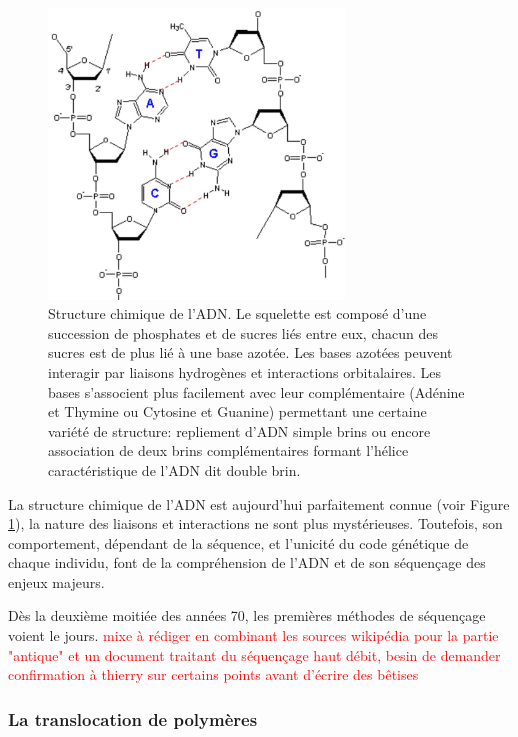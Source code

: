 \documentclass[a4paper,11pt]{article}
\begin{document}
\begin{figure}[H]
\begin{center}
\includegraphics[width=0.7\textwidth]{adn.jpg}

\caption{Structure chimique de l'ADN. Le squelette est composé d'une succession de phosphates et de sucres liés entre eux, chacun des sucres est de plus lié à une base azotée. Les bases azotées peuvent interagir par liaisons hydrogènes et interactions orbitalaires. Les bases s'associent plus facilement avec leur complémentaire (Adénine et Thymine ou Cytosine et Guanine) permettant une certaine variété de structure: repliement d'ADN simple brins ou encore association de deux brins complémentaires formant l'hélice caractéristique de l'ADN dit double brin.}
\label{adn}
\end{center}
\end{figure}

La structure chimique de l'ADN est aujourd'hui parfaitement connue (voir Figure \ref{adn}), la nature des liaisons et interactions ne sont plus mystérieuses. Toutefois, son comportement, dépendant de la séquence, et l'unicité du code génétique de chaque individu,  font de la compréhension de l'ADN et de son séquençage des enjeux majeurs. 

Dès la deuxième moitiée des années 70, les premières méthodes de séquençage voient le jours.
\textcolor{red}{mixe à rédiger en combinant les sources wikipédia pour la partie "antique" et un document traitant du séquençage haut débit, besin de demander confirmation à thierry sur certains points avant d'écrire des b\^{e}tises}

\subsubsection{La translocation de polymères}
\end{document}
